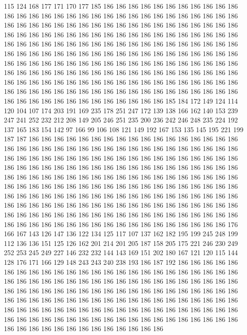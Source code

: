 115 124 168 177 171 170 177 185 186 186 186 186 186 186 186 186 186 186 186 186
186 186 186 186 186 186 186 186 186 186 186 186 186 186 186 186 186 186 186 186
186 186 186 186 186 186 186 186 186 186 186 186 186 186 186 186 186 186 186 186
186 186 186 186 186 186 186 186 186 186 186 186 186 186 186 186 186 186 186 186
186 186 186 186 186 186 186 186 186 186 186 186 186 186 186 186 186 186 186 186
186 186 186 186 186 186 186 186 186 186 186 186 186 186 186 186 186 186 186 186
186 186 186 186 186 186 186 186 186 186 186 186 186 186 186 186 186 186 186 186
186 186 186 186 186 186 186 186 186 186 186 186 186 186 186 186 186 186 186 186
186 186 186 186 186 186 186 186 186 186 186 186 186 186 186 186 186 186 186 186
186 186 186 186 186 186 186 186 186 186 186 186 186 186 186 186 186 186 186 186
186 186 186 185 184 172 149 124 114 120 104 107 174 203 191 169 235 178 251 247
172 139 138 166 162 140 153 239 247 241 252 232 212 208 149 205 246 251 235 200
236 242 246 248 235 224 192 137 165 183 154 142 97 166 99 106 108 121 149 192
167 153 135 145 195 221 199 187 187 186 186 186 186 186 186 186 186 186 186 186
186 186 186 186 186 186 186 186 186 186 186 186 186 186 186 186 186 186 186 186
186 186 186 186 186 186 186 186 186 186 186 186 186 186 186 186 186 186 186 186
186 186 186 186 186 186 186 186 186 186 186 186 186 186 186 186 186 186 186 186
186 186 186 186 186 186 186 186 186 186 186 186 186 186 186 186 186 186 186 186
186 186 186 186 186 186 186 186 186 186 186 186 186 186 186 186 186 186 186 186
186 186 186 186 186 186 186 186 186 186 186 186 186 186 186 186 186 186 186 186
186 186 186 186 186 186 186 186 186 186 186 186 186 186 186 186 186 186 186 186
186 186 186 186 186 186 186 186 186 186 186 186 186 186 186 186 186 186 186 186
186 186 186 186 186 186 186 186 186 186 186 186 186 186 186 186 176 166 167 143
126 147 136 122 134 125 117 107 137 162 182 195 199 245 248 199 112 136 136 151
125 126 162 201 214 201 205 187 158 205 175 221 246 230 249 252 253 245 249 227
146 232 232 144 143 169 151 202 180 167 121 120 115 144 128 176 171 166 129 148
243 243 240 238 193 186 187 192 186 186 186 186 186 186 186 186 186 186 186 186
186 186 186 186 186 186 186 186 186 186 186 186 186 186 186 186 186 186 186 186
186 186 186 186 186 186 186 186 186 186 186 186 186 186 186 186 186 186 186 186
186 186 186 186 186 186 186 186 186 186 186 186 186 186 186 186 186 186 186 186
186 186 186 186 186 186 186 186 186 186 186 186 186 186 186 186 186 186 186 186
186 186 186 186 186 186 186 186 186 186 186 186 186 186 186 186 186 186 186 186
186 186 186 186 186 186 186 186 186 186 186 186 186 186 186 186 186 186 186 186
